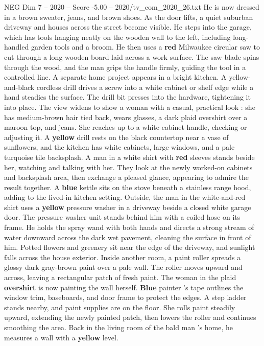 \begin{textsample}{NEG Dim 7 – 2020 – Score -5.00 – 2020/tv\_com\_2020\_26.txt}
He is now dressed in a brown sweater, jeans, and brown shoes.
As the door lifts, a quiet suburban driveway and houses across the street become visible.
He steps into the garage, which has tools hanging neatly on the wooden wall to the left, including long-handled garden tools and a broom.
He then uses a \textbf{red} Milwaukee circular saw to cut through a long wooden board laid across a work surface.
The saw blade spins through the wood, and the man grips the handle firmly, guiding the tool in a controlled line.
A separate home project appears in a bright kitchen.
A yellow-and-black cordless drill drives a screw into a white cabinet or shelf edge while a hand steadies the surface.
The drill bit presses into the hardware, tightening it into place.
The view widens to show a woman with a casual, practical look : she has medium-brown hair tied back, wears glasses, a dark plaid overshirt over a maroon top, and jeans.
She reaches up to a white cabinet handle, checking or adjusting it.
A \textbf{yellow} drill rests on the black countertop near a vase of sunflowers, and the kitchen has white cabinets, large windows, and a pale turquoise tile backsplash.
A man in a white shirt with \textbf{red} sleeves stands beside her, watching and talking with her.
They look at the newly worked-on cabinets and backsplash area, then exchange a pleased glance, appearing to admire the result together.
A \textbf{blue} kettle sits on the stove beneath a stainless range hood, adding to the lived-in kitchen setting.
Outside, the man in the white-and-red shirt uses a \textbf{yellow} pressure washer in a driveway beside a closed white garage door.
The pressure washer unit stands behind him with a coiled hose on its frame.
He holds the spray wand with both hands and directs a strong stream of water downward across the dark wet pavement, cleaning the surface in front of him.
Potted flowers and greenery sit near the edge of the driveway, and sunlight falls across the house exterior.
Inside another room, a paint roller spreads a glossy dark gray-brown paint over a pale wall.
The roller moves upward and across, leaving a rectangular patch of fresh paint.
The woman in the plaid \textbf{overshirt} is now painting the wall herself. \textbf{Blue} painter ’s tape outlines the window trim, baseboards, and door frame to protect the edges.
A step ladder stands nearby, and paint supplies are on the floor.
She rolls paint steadily upward, extending the newly painted patch, then lowers the roller and continues smoothing the area.
Back in the living room of the bald man ’s home, he measures a wall with a \textbf{yellow} level.

\end{textsample}
